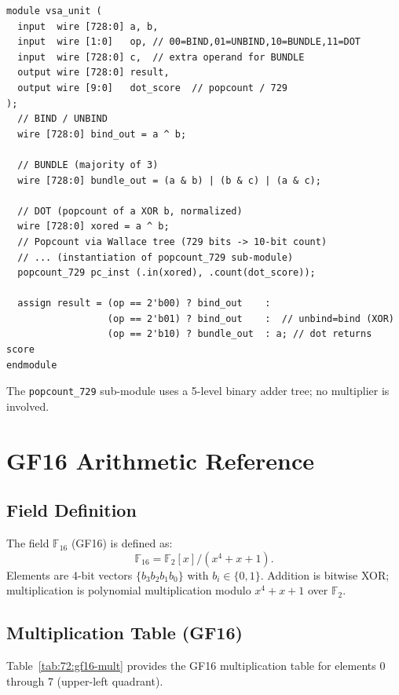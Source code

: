 \begin{verbatim}
module vsa_unit (
  input  wire [728:0] a, b,
  input  wire [1:0]   op, // 00=BIND,01=UNBIND,10=BUNDLE,11=DOT
  input  wire [728:0] c,  // extra operand for BUNDLE
  output wire [728:0] result,
  output wire [9:0]   dot_score  // popcount / 729
);
  // BIND / UNBIND
  wire [728:0] bind_out = a ^ b;

  // BUNDLE (majority of 3)
  wire [728:0] bundle_out = (a & b) | (b & c) | (a & c);

  // DOT (popcount of a XOR b, normalized)
  wire [728:0] xored = a ^ b;
  // Popcount via Wallace tree (729 bits -> 10-bit count)
  // ... (instantiation of popcount_729 sub-module)
  popcount_729 pc_inst (.in(xored), .count(dot_score));

  assign result = (op == 2'b00) ? bind_out    :
                  (op == 2'b01) ? bind_out    :  // unbind=bind (XOR)
                  (op == 2'b10) ? bundle_out  : a; // dot returns score
endmodule
\end{verbatim}

The \texttt{popcount\_729} sub-module uses a 5-level binary adder tree;
no multiplier is involved.

\section{GF16 Arithmetic Reference}
\label{sec:72:gf16-reference}

\subsection{Field Definition}
\label{subsec:72:gf16-field}

The field $\mathbb{F}_{16}$ (GF16) is defined as:
\[
  \mathbb{F}_{16} = \mathbb{F}_2[x] / (x^4 + x + 1).
\]
Elements are 4-bit vectors $\{b_3 b_2 b_1 b_0\}$ with
$b_i \in \{0,1\}$.
Addition is bitwise XOR; multiplication is polynomial
multiplication modulo $x^4 + x + 1$ over $\mathbb{F}_2$.

\subsection{Multiplication Table (GF16)}
\label{subsec:72:gf16-mult-table}

Table~\ref{tab:72:gf16-mult} provides the GF16 multiplication
table for elements 0 through 7 (upper-left quadrant).


